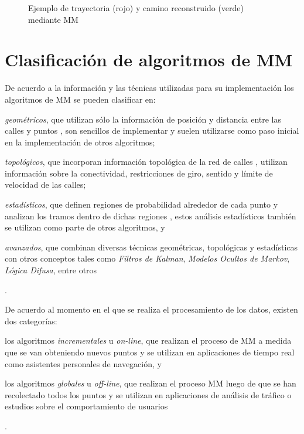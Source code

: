 \begin{figure}[h]
	\centering
	
	\caption[Trayectoria y camino reconstruido mediante MM]{Ejemplo de trayectoria (rojo) y camino reconstruido (verde) mediante MM}
	\label{fig:map-matching} 
\end{figure}

\section{Clasificación de algoritmos de MM}

De acuerdo a la información y las técnicas utilizadas para su implementación los algoritmos de MM se pueden clasificar en: \begin{enumerate*}[1)]\item \emph{geométricos}, que utilizan sólo la información de posición y distancia entre las calles y puntos \cite{white2000some}, son sencillos de implementar y suelen utilizarse como paso inicial en la implementación de otros algoritmos; \item \emph{topológicos}, que incorporan información topológica de la red de calles \cite{lou2009map,yuan2010interactive,greenfeld2002matching,quddus2003general}, utilizan información sobre la conectividad, restricciones de giro, sentido y límite de velocidad de las calles; \item \emph{estadísticos}, que definen regiones de probabilidad alrededor de cada punto y analizan los tramos dentro de dichas regiones \cite{ochieng2009map}, estos análisis estadísticos también se utilizan como parte de otros algoritmos, y \item \emph{avanzados}, que combinan diversas técnicas geométricas, topológicas y estadísticas con otros conceptos tales como \emph{Filtros de Kalman}, \emph{Modelos Ocultos de Markov}, \emph{Lógica Difusa}, entre otros \cite{thiagarajan2009vtrack,quddus2006high,thiagarajan2011accurate,fang2011enacq}\end{enumerate*}.

De acuerdo al momento en el que se realiza el procesamiento de los datos, existen dos categorías: \begin{enumerate*}[1)] \item los algoritmos \emph{incrementales} u \emph{on-line}, que realizan el proceso de MM a medida que se van obteniendo nuevos puntos \cite{thiagarajan2009vtrack,thiagarajan2011accurate,greenfeld2002matching,quddus2003general,quddus2006high} y se utilizan en aplicaciones de tiempo real como asistentes personales de navegación, y \item los algoritmos \emph{globales} u \emph{off-line}, que realizan el proceso MM luego de que se han recolectado todos los puntos \cite{lou2009map,yuan2010interactive} y se utilizan en aplicaciones de análisis de tráfico o estudios sobre el comportamiento de usuarios\end{enumerate*}.

